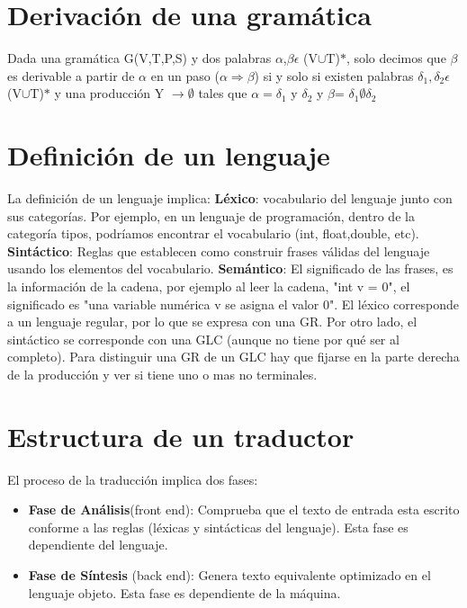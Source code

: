 \section{Derivación de una gramática}
Dada una gramática G(V,T,P,S) y dos palabras $\alpha$,$\beta \epsilon$ (V$\cup$T)$\ast$, solo decimos que $\beta$ es derivable a partir de $\alpha$ en un paso ($\alpha \Rightarrow \beta$) si y solo si existen palabras $\delta_1, \delta_2 \epsilon$ (V$\cup$T)$\ast$ y una producción Y $\longrightarrow \emptyset$ tales que $\alpha = \delta_1$ y $\delta_2$ y $\beta$= $\delta_1 \emptyset \delta_2$
\section{Definición de un lenguaje}
La definición de un lenguaje implica:
\newline
\newline
\textbf{Léxico}: vocabulario del lenguaje junto con sus categorías. Por ejemplo, en un lenguaje de programación, dentro de la categoría tipos, podríamos encontrar el vocabulario (int, float,double, etc).
\newline
\newline
\textbf{Sintáctico}: Reglas que establecen como construir frases válidas del lenguaje usando los elementos del vocabulario.
\newline
\newline
\textbf{Semántico}: El significado de las frases, es la información de la cadena, por ejemplo al leer la cadena, "int v = 0", el significado es "una variable numérica v se asigna el valor 0".
\newline
\newline
El léxico corresponde a un lenguaje regular, por lo que se expresa con una GR. Por otro lado, el sintáctico se corresponde con una GLC (aunque no tiene por qué ser al completo).
\newline
\newline
Para distinguir una GR de un GLC hay que fijarse en la parte derecha de la producción y ver si tiene uno o mas no terminales.

\section{Estructura de un traductor}
El proceso de la traducción implica dos fases:
\begin{itemize}
	\item \textbf{Fase de Análisis}(front end): Comprueba que el texto de entrada esta escrito conforme a las reglas (léxicas y sintácticas del lenguaje). Esta fase es dependiente del lenguaje.
	\item \textbf{Fase de Síntesis} (back end): Genera texto equivalente optimizado en el lenguaje objeto. Esta fase es dependiente de la máquina.
\end{itemize}

